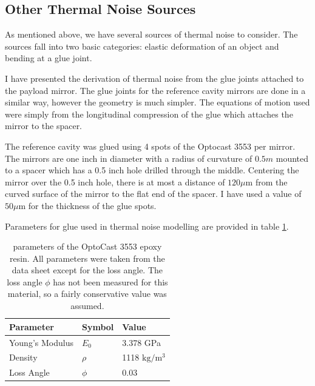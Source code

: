 \subsection{Other Thermal Noise Sources}

As mentioned above, we have several sources of thermal noise to consider.
The sources fall into two basic categories: elastic deformation of an object
and bending at a glue joint.

I have presented the derivation of thermal noise from the glue joints attached to
the payload mirror.
The glue joints for the reference cavity mirrors are done in a similar way,
however the geometry is much simpler.
The equations of motion used were simply from the longitudinal compression of the
glue which attaches the mirror to the spacer.

The reference cavity was glued using 4 spots of the Optocast 3553 per mirror.
The mirrors are one inch in diameter with a radius of curvature of $0.5m$
mounted to a spacer which has a 0.5 inch hole drilled through the middle.
Centering the mirror over the 0.5 inch hole, there is at most a distance of
$120 \mu\mathrm{m}$ from the curved surface of the mirror to the flat end
of the spacer.
I have used a value of $50 \mu\mathrm{m}$ for the thickness of the glue spots.

Parameters for glue used in thermal noise modelling are provided in table
\ref{tab:epoxyparams}.


\begin{table}
  \begin{center}
    \small
    \begin{tabular}{|l|l|l|}
      \hline
      Parameter & Symbol & Value \\
      \hline
      \hline
      Young's Modulus & $E_0$ & 3.378 GPa \\
      \hline
      Density & $\rho$ & 1118 $\mathrm{kg/m^3}$ \\
      \hline
      Loss Angle & $\phi$ & 0.03 \\
      \hline
    \end{tabular}
  \end{center}
  \caption[Epoxy Parameters]{
      parameters of the OptoCast 3553 epoxy resin.
      All parameters were taken from the data sheet except for the loss angle.
      The loss angle $\phi$ has not been measured for this material,
      so a fairly conservative value was assumed.
      }
  \label{tab:epoxyparams}
\end{table}

